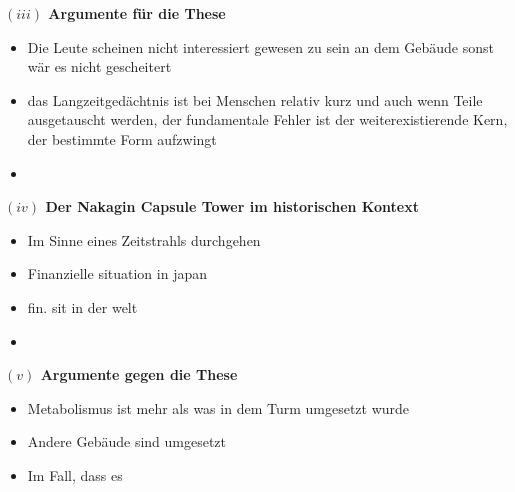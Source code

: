 \documentclass[a4paper, 12pt]{article}
\begin{document}
\begin{onehalfspace}

\vspace{5mm}
\noindent\textbf{$(iii)$ Argumente für die These}



\begin{itemize}
  \item Die Leute scheinen nicht interessiert gewesen zu sein an dem Gebäude sonst wär es nicht gescheitert
  \item das Langzeitgedächtnis ist bei Menschen relativ kurz und auch wenn Teile ausgetauscht werden, der fundamentale Fehler ist der weiterexistierende Kern, der bestimmte Form aufzwingt
  \item 
\end{itemize}



\vspace{5mm}
\noindent\textbf{$(iv)$ Der Nakagin Capsule Tower im historischen Kontext}



\begin{itemize}
  \item Im Sinne eines Zeitstrahls durchgehen
  \item Finanzielle situation in japan
  \item fin. sit in der welt
  \item 
\end{itemize}



\vspace{5mm}
\noindent\textbf{$(v)$ Argumente gegen die These}



\begin{itemize}
  \item Metabolismus ist mehr als was in dem Turm umgesetzt wurde
  \item Andere Gebäude sind umgesetzt
  \item Im Fall, dass es 
\end{itemize}



\end{onehalfspace}
\end{document}
